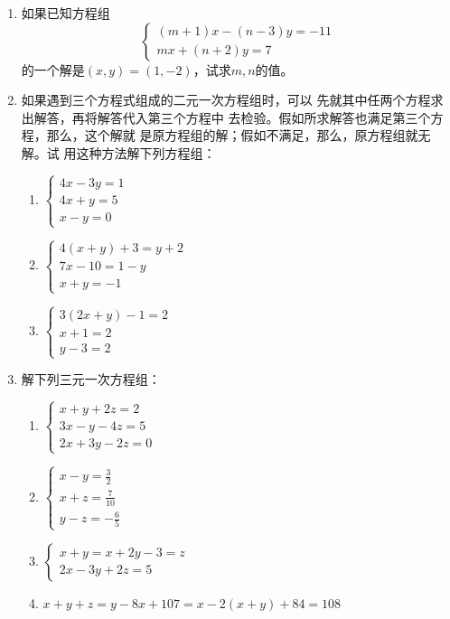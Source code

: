 \begin{enumerate}
\item 如果已知方程组
\[\begin{cases}
  (m+1)x-(n-3)y  =-11\\
  mx+(n+2)y=7 
    \end{cases}\]
的一个解是$(x,y)=(1,-2)$，试求$m,n$的值。

\item 如果遇到三个方程式组成的二元一次方程组时，可以
先就其中任两个方程求出解答，再将解答代入第三个方程中
去检验。假如所求解答也满足第三个方程，那么，这个解就
是原方程组的解；假如不满足，那么，原方程组就无解。试
用这种方法解下列方程组：
\begin{multicols}{2}
    \begin{enumerate}
\item $\begin{cases}
4x-3y=1\\4x+y=5\\x-y=0
\end{cases}$
\item $\begin{cases}
4(x+y)+3=y+2\\ 7x-10=1-y\\ x+y=-1
\end{cases}$
\item $\begin{cases}
    3(2x+y)-1=2\\ x+1=2\\ y-3=2
    \end{cases}$
    \end{enumerate}
\end{multicols}

\item 解下列三元一次方程组：
    \begin{enumerate}
\item $\begin{cases}
    x+y+2z=2\\ 3x-y-4z=5\\ 2x+3y-2z=0
    \end{cases}$
\item $\begin{cases}
    x-y=\frac{3}{2}\\x+z=\frac{7}{10}\\y-z=-\frac{6}{5}
    \end{cases}$
    \item $\begin{cases}
    x+y=x+2y-3=z\\ 2x-3y+2z=5
    \end{cases}$
    \item $
    x+y+z=y-8x+107=x-2(x+y)+84=108$
    \end{enumerate}


\end{enumerate}
